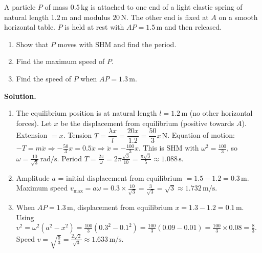 \documentclass[11pt]{article}
\newcounter{popsec}
\newcounter{popsub}
\newcommand{\courssub}[1]{%
  \stepcounter{popsub}%
  \par\vspace{9pt}\noindent{\popxbold\fontsize{11.5}{13}\selectfont\color{popink}{\color{poporange}\thepopsec.\thepopsub}\hspace{6pt}#1}\par\nopagebreak\vspace{4pt}
}
\begin{document}
\courssub{Worked Examples}

\begin{exoresolu}
A particle $P$ of mass $0.5\,\mathrm{kg}$ is attached to one end of a light elastic spring of natural length $1.2\,\mathrm{m}$ and modulus $20\,\mathrm{N}$. The other end is fixed at $A$ on a smooth horizontal table. $P$ is held at rest with $AP = 1.5\,\mathrm{m}$ and then released.
\begin{enumerate}
    \item Show that $P$ moves with SHM and find the period.
    \item Find the maximum speed of $P$.
    \item Find the speed of $P$ when $AP = 1.3\,\mathrm{m}$.
\end{enumerate}

\tcblower
\textbf{Solution.}
\begin{enumerate}
    \item The equilibrium position is at natural length $l = 1.2\,\mathrm{m}$ (no other horizontal forces). Let $x$ be the displacement from equilibrium (positive towards $A$). Extension $= x$. Tension $T = \dfrac{\lambda x}{l} = \dfrac{20x}{1.2} = \dfrac{50}{3}x\,\mathrm{N}$.
    Equation of motion: $-T = m\ddot{x} \Rightarrow -\frac{50}{3}x = 0.5\ddot{x} \Rightarrow \ddot{x} = -\frac{100}{3}x$.
    This is SHM with $\omega^2 = \frac{100}{3}$, so $\omega = \frac{10}{\sqrt{3}}\,\mathrm{rad/s}$.
    Period $T = \frac{2\pi}{\omega} = 2\pi\frac{\sqrt{3}}{10} = \frac{\pi\sqrt{3}}{5} \approx 1.088\,\mathrm{s}$.
    \item Amplitude $a$ = initial displacement from equilibrium $= 1.5 - 1.2 = 0.3\,\mathrm{m}$.
    Maximum speed $v_{\max} = a\omega = 0.3 \times \frac{10}{\sqrt{3}} = \frac{3}{\sqrt{3}} = \sqrt{3} \approx 1.732\,\mathrm{m/s}$.
    \item When $AP = 1.3\,\mathrm{m}$, displacement from equilibrium $x = 1.3 - 1.2 = 0.1\,\mathrm{m}$.
    Using $v^2 = \omega^2(a^2 - x^2) = \frac{100}{3}(0.3^2 - 0.1^2) = \frac{100}{3}(0.09 - 0.01) = \frac{100}{3} \times 0.08 = \frac{8}{3}$.
    Speed $v = \sqrt{\frac{8}{3}} = \frac{2\sqrt{2}}{\sqrt{3}} \approx 1.633\,\mathrm{m/s}$.
\end{enumerate}
\end{exoresolu}
\end{document}
